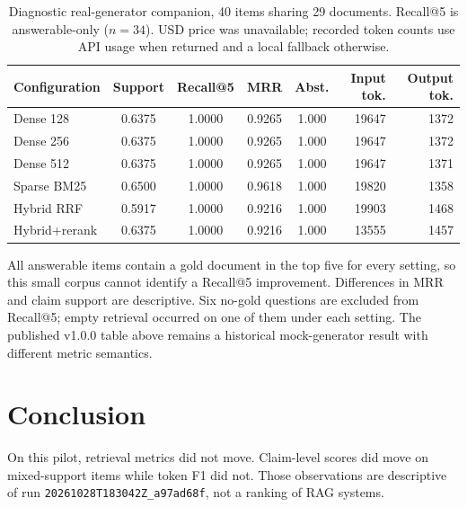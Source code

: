 \documentclass[10pt,twocolumn]{article}
\begin{document}
\begin{table}[t]
\centering
\small
\caption{Diagnostic real-generator companion, 40 items sharing 29 documents. Recall@5 is answerable-only ($n=34$). USD price was unavailable; recorded token counts use API usage when returned and a local fallback otherwise.}
\label{tab:live}
\begin{tabular}{lccccrr}
\toprule
\textbf{Configuration} & \textbf{Support} & \textbf{Recall@5} & \textbf{MRR} & \textbf{Abst.} & \textbf{Input tok.} & \textbf{Output tok.} \\
\midrule
Dense 128 & 0.6375 & 1.0000 & 0.9265 & 1.000 & 19647 & 1372 \\
Dense 256 & 0.6375 & 1.0000 & 0.9265 & 1.000 & 19647 & 1372 \\
Dense 512 & 0.6375 & 1.0000 & 0.9265 & 1.000 & 19647 & 1371 \\
Sparse BM25 & 0.6500 & 1.0000 & 0.9618 & 1.000 & 19820 & 1358 \\
Hybrid RRF & 0.5917 & 1.0000 & 0.9216 & 1.000 & 19903 & 1468 \\
Hybrid+rerank & 0.6375 & 1.0000 & 0.9216 & 1.000 & 13555 & 1457 \\
\bottomrule
\end{tabular}
\end{table}

All answerable items contain a gold document in the top five for every setting, so this small corpus cannot identify a Recall@5 improvement. Differences in MRR and claim support are descriptive. Six no-gold questions are excluded from Recall@5; empty retrieval occurred on one of them under each setting. The published v1.0.0 table above remains a historical mock-generator result with different metric semantics.

\section{Conclusion}
On this pilot, retrieval metrics did not move. Claim-level scores did move on mixed-support items while token F1 did not. Those observations are descriptive of run \texttt{20261028T183042Z\_a97ad68f}, not a ranking of RAG systems.



\end{document}

